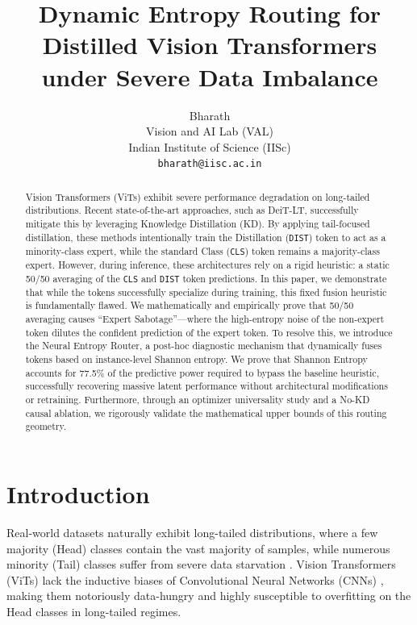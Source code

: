 \documentclass[10pt,twocolumn,letterpaper]{article}
\title{Dynamic Entropy Routing for Distilled Vision Transformers \\ under Severe Data Imbalance}
\author{
Bharath \\
Vision and AI Lab (VAL) \\
Indian Institute of Science (IISc) \\
{\tt\small bharath@iisc.ac.in}
}
\begin{document}
\maketitle

\begin{abstract}
Vision Transformers (ViTs) exhibit severe performance degradation on long-tailed distributions. Recent state-of-the-art approaches, such as DeiT-LT, successfully mitigate this by leveraging Knowledge Distillation (KD). By applying tail-focused distillation, these methods intentionally train the Distillation (\texttt{DIST}) token to act as a minority-class expert, while the standard Class (\texttt{CLS}) token remains a majority-class expert. However, during inference, these architectures rely on a rigid heuristic: a static 50/50 averaging of the \texttt{CLS} and \texttt{DIST} token predictions. In this paper, we demonstrate that while the tokens successfully specialize during training, this fixed fusion heuristic is fundamentally flawed. We mathematically and empirically prove that 50/50 averaging causes ``Expert Sabotage''—where the high-entropy noise of the non-expert token dilutes the confident prediction of the expert token. To resolve this, we introduce the Neural Entropy Router, a post-hoc diagnostic mechanism that dynamically fuses tokens based on instance-level Shannon entropy. We prove that Shannon Entropy accounts for 77.5\% of the predictive power required to bypass the baseline heuristic, successfully recovering massive latent performance without architectural modifications or retraining. Furthermore, through an optimizer universality study and a No-KD causal ablation, we rigorously validate the mathematical upper bounds of this routing geometry.
\end{abstract}

\section{Introduction}

Real-world datasets naturally exhibit long-tailed distributions, where a few majority (Head) classes contain the vast majority of samples, while numerous minority (Tail) classes suffer from severe data starvation \cite{liu2019large, cao2019learning, cui2019class, kang2019decoupling}. Vision Transformers (ViTs) \cite{dosovitskiy2020image} lack the inductive biases of Convolutional Neural Networks (CNNs) \cite{he2016deep, krizhevsky2012imagenet}, making them notoriously data-hungry and highly susceptible to overfitting on the Head classes in long-tailed regimes.
\end{document}
